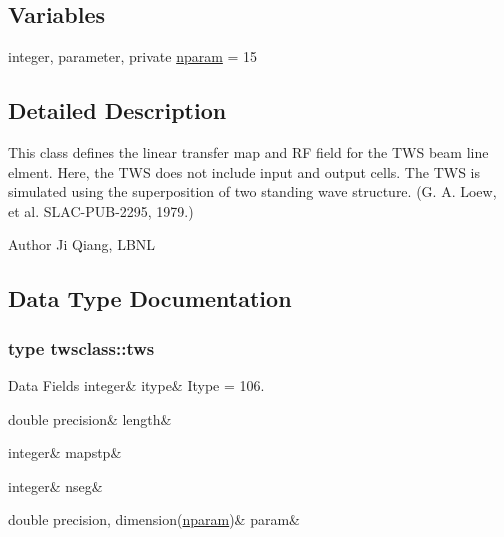 \subsection*{Variables}
\begin{DoxyCompactItemize}
\item 
integer, parameter, private \mbox{\hyperlink{namespacetwsclass_ae92106a92b2952cbb34ae48df4c6b375}{nparam}} = 15
\end{DoxyCompactItemize}


\subsection{Detailed Description}
This class defines the linear transfer map and RF field for the T\+WS beam line elment. Here, the T\+WS does not include input and output cells. The T\+WS is simulated using the superposition of two standing wave structure. (G. A. Loew, et al. S\+L\+A\+C-\/\+P\+U\+B-\/2295, 1979.) 

\begin{DoxyAuthor}{Author}
Ji Qiang, L\+B\+NL 
\end{DoxyAuthor}


\subsection{Data Type Documentation}
\label{structtwsclass_1_1tws}
\subsubsection{type twsclass\+::tws}
\begin{DoxyFields}{Data Fields}
\mbox{\label{namespacetwsclass_a2dcf113402de09fb0cbb7a7779dd11f2}} 
integer&
itype&
Itype = 106. \\
\hline

\mbox{\label{namespacetwsclass_a21f6cc9104c13b52b03da5b9e283f07b}} 
double precision&
length&
\\
\hline

\mbox{\label{namespacetwsclass_a023933666722b8509103d43f82f3c251}} 
integer&
mapstp&
\\
\hline

\mbox{\label{namespacetwsclass_a9977eae9217b979dc25554e7f3453339}} 
integer&
nseg&
\\
\hline

\mbox{\label{namespacetwsclass_ada2bbea749395b11dbf0f9d8b27b5fcf}} 
double precision, dimension(\mbox{\hyperlink{namespacetwsclass_ae92106a92b2952cbb34ae48df4c6b375}{nparam}})&
param&
\\
\hline

\end{DoxyFields}


